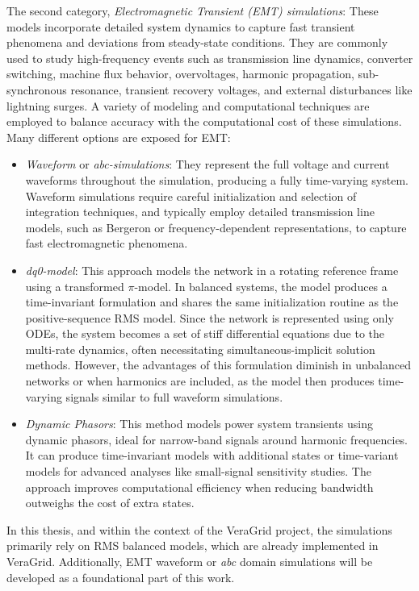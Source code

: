 The second category, \textit{Electromagnetic Transient (EMT) simulations}: These models incorporate detailed system dynamics to capture fast transient phenomena and deviations 
from steady-state conditions. They are commonly used to study high-frequency events such as transmission line dynamics, converter switching, machine flux behavior, 
overvoltages, harmonic propagation, sub-synchronous resonance, transient recovery voltages, and external disturbances like lightning surges. 
A variety of modeling and computational techniques are employed to balance accuracy with the computational cost of these simulations.
Many different options are exposed for EMT:

\begin{itemize}
    \item \textit{Waveform} or \textit{abc-simulations}: They represent the full voltage and current waveforms throughout the simulation, producing a fully time-varying system. 
Waveform simulations require careful initialization and selection of integration techniques, and typically employ detailed transmission line models, such as Bergeron or frequency-dependent
representations, to capture fast electromagnetic phenomena.
    \item \textit{dq0-model}: This approach models the network in a rotating reference frame using a transformed $\pi$-model. In balanced systems, the model produces a time-invariant 
    formulation and shares the same initialization routine as the positive-sequence RMS model. Since the network is represented using only ODEs, the system becomes a set of 
    stiff differential equations due to the multi-rate dynamics, often necessitating simultaneous-implicit solution methods. However, the advantages of this 
    formulation diminish in unbalanced networks or when harmonics are included, as the model then produces time-varying signals similar to full waveform simulations.
    \item \textit{Dynamic Phasors}: This method models power system transients using dynamic phasors, ideal for narrow-band signals around harmonic frequencies. 
    It can produce time-invariant models with additional states or time-variant models for advanced analyses like small-signal sensitivity studies. 
    The approach improves computational efficiency when reducing bandwidth outweighs the cost of extra states.
\end{itemize}

In this thesis, and within the context of the VeraGrid project, the simulations primarily rely on RMS balanced models, which are already implemented in VeraGrid. 
Additionally, EMT waveform  or \textit{abc} domain simulations will be developed as a foundational part of this work.


